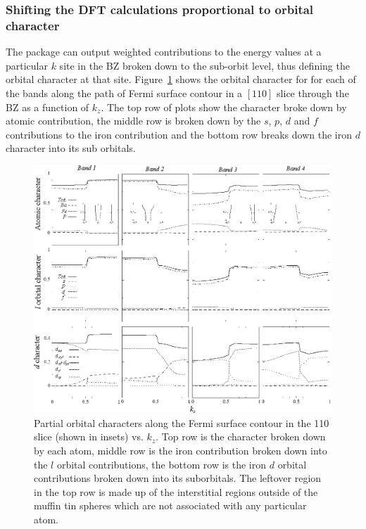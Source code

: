\subsubsection{Shifting the \ac{DFT} calculations proportional to orbital character}
\label{Sec:ResD:ShiftingDFTPropToOrbitalCharacter}

The \WIEN package can output weighted contributions to the energy values at a particular $k$ site in the \ac{BZ} broken down to the sub-orbit level, thus defining the orbital character at that site. Figure~\ref{Fig:ResD:Band2DCharacterVsKz} shows the orbital character for for each of the bands along the path of Fermi surface contour in a $[110]$ slice through the \BaFeP \ac{BZ} as a function of $k_z$. The top row of plots show the character broke down by atomic contribution, the middle row is broken down by the $s$, $p$, $d$ and $f$ contributions to the iron contribution and the bottom row breaks down the iron $d$ character into its sub orbitals.
\begin{figure}[htbp]
    \begin{center}
        \includegraphics[scale=1.15]{Chapter-dHvABaFe2P2/Figures/AngleDepMeasurements/BandCharacterVsKz/AllBandCharacterVsKz}
        \caption{Partial orbital characters along the Fermi surface contour in the 110 slice (shown in insets) vs. $k_z$. Top row is the character broken down by each atom, middle row is the iron contribution broken down into the $l$ orbital contributions, the bottom row is the iron $d$ orbital contributions broken down into its suborbitals. The leftover region in the top row is made up of the interstitial regions outside of the muffin tin spheres which are not associated with any particular atom.}
        \label{Fig:ResD:Band2DCharacterVsKz}
    \end{center}
\end{figure}

